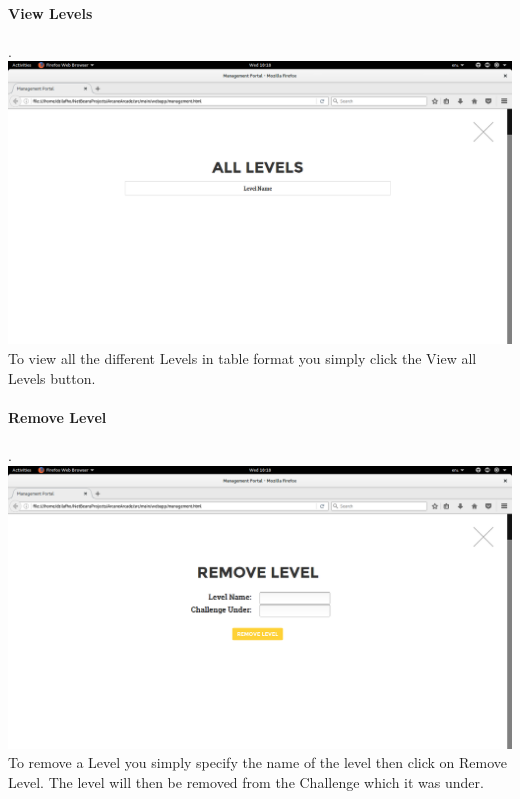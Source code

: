 \documentclass[english]{article}
\begin{document}
				\paragraph{View Levels}. \\ \newline
				\includegraphics[width=\linewidth]{ViewLevels.png}				\newline
				To view all the different Levels in table format you simply click the View all Levels button.\newline

				\paragraph{Remove Level}. \\ \newline
				\includegraphics[width=\linewidth]{RemoveLevel.png}				\newline
To remove a Level you simply specify the name of the level then click on Remove Level. The level will then be removed from the Challenge which it was under.
				\\[12pt]
				
\end{document}
